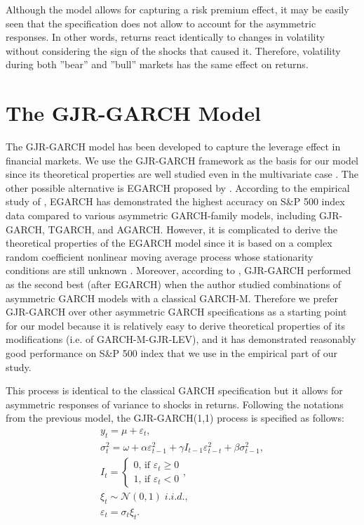 \documentclass[authoryear, 1p]{elsarticle}
\numberwithin{equation}{section}
\begin{document}
Although the model allows for capturing a risk premium effect, it may be easily seen that the specification does not allow to account for the asymmetric responses. In other words, returns react identically to changes in volatility without considering the sign of the shocks that caused it. Therefore, volatility during both ''bear'' and ''bull'' markets has the same effect on returns.

\section{The GJR-GARCH Model}\label{Section3}

The GJR-GARCH \citep{Glosten1993} model has been developed to capture the leverage effect in financial markets. We use the GJR-GARCH framework as the basis for our model since its theoretical properties are well studied even in the multivariate case \citep{MGJR}. The other possible alternative is EGARCH proposed by \citep{Nelson1991}. According to the empirical study of \citep{Awartani}, EGARCH has demonstrated the highest accuracy on S\&P 500 index data compared to various asymmetric GARCH-family models, including GJR-GARCH, TGARCH, and AGARCH. However, it is complicated to derive the theoretical properties of the EGARCH model since it is based on a complex random coefficient nonlinear moving average process whose stationarity conditions are still unknown \citep{EGARCH2014}. Moreover, according to \citep{Awartani}, GJR-GARCH performed as the second best (after EGARCH) when the author studied combinations of asymmetric GARCH models with a classical GARCH-M. Therefore we prefer GJR-GARCH over other asymmetric GARCH specifications as a starting point for our model because it is relatively easy to derive theoretical properties of its modifications (i.e. of GARCH-M-GJR-LEV), and it has demonstrated reasonably good performance on S\&P 500 index that we use in the empirical part of our study.

This process is identical to the classical GARCH specification but it allows for asymmetric responses of variance to shocks in returns. Following the notations from the previous model, the GJR-GARCH(1,1) process is specified as follows:
\begin{equation}
\begin{gathered}
y_{t} = \mu + \varepsilon_{t}, \\ 
\sigma^2_{t} = \omega + \alpha \varepsilon^2_{t-1} + \gamma I_{t-1} \varepsilon^2_{t-t} + \beta \sigma^2_{t-1}, \\ 
I_{t}=\begin{cases}0\text{, if }\varepsilon_{t}\geq 0 \\1\text{, if }\varepsilon_{t}< 0\end{cases},\\
\xi_{t} \sim \mathcal{N} \left(0,1\right) \; i.i.d., \\ 
\varepsilon_{t} = \sigma_{t} \xi_{t}.  
\end{gathered}
\end{equation}
\end{document}
